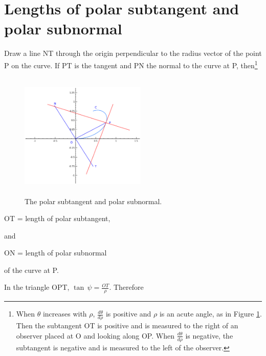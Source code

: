 \section{Lengths of polar subtangent and polar subnormal}

Draw a line NT through the origin perpendicular to the 
radius vector of the point P on the curve. If PT is the 
tangent and PN the normal to the curve at P, 
then\footnote{When $\theta$ increases with $\rho$, $\frac{d\theta}{d\rho}$ 
is positive and $\rho$ is an acute angle, as in Figure \ref{fig:polar-subtangent}. 
Then the subtangent OT is positive and is measured to the right 
of an observer placed at O and looking along OP. When 
$\frac{d\theta}{d\rho}$ is negative, the subtangent is negative and 
is measured to the left of the observer.}

\begin{figure}[h!]
\begin{minipage}{\textwidth}
\begin{center}
\includegraphics[height=6cm,width=6cm]{polar-subtangent2.eps}
\end{center}
\end{minipage}
\caption{The polar subtangent and polar subnormal.}
\label{fig:polar-subtangent}
\end{figure}

\begin{center}
OT = length of polar subtangent,
\end{center}
and 	
\begin{center}
ON = length of polar subnormal
\end{center}
of the curve at P.

In the triangle OPT, $\tan\, \psi = \frac{OT}{\rho}$. Therefore

